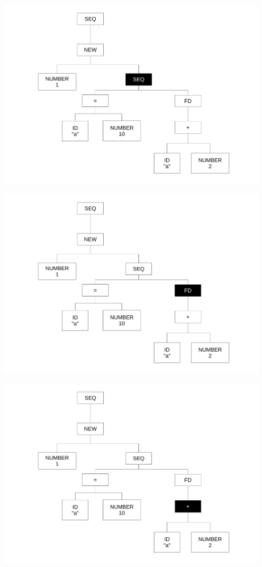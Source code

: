 \begin{frame}
\includegraphics[scale=0.3]{doc/Presentation/img/arbre4.pdf}
\end{frame}

\begin{frame}
\includegraphics[scale=0.3]{doc/Presentation/img/arbre8.pdf}
\end{frame}

\begin{frame}
\includegraphics[scale=0.3]{doc/Presentation/img/arbre9.pdf}
\end{frame}

